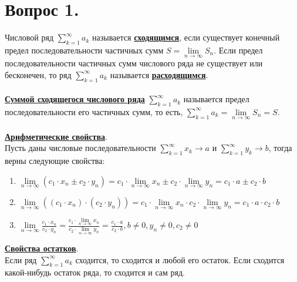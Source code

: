 \documentclass{report}
\begin{document}
\section{Вопрос 1.}

Числовой ряд $\sum\limits_{k=1}^\infty a_k$ называется \textbf{\uline{сходящимся}}, если существует конечный предел последовательности частичных сумм $S = \lim\limits_{n \to \infty} S_n$. Если предел последовательности частичных сумм числового ряда не существует или бесконечен, то ряд $\sum\limits_{k=1}^\infty a_k$ называется \textbf{\uline{расходящимся}}.\\\\

\textbf{\uline{Суммой сходящегося числового ряда}} $\sum\limits_{k=1}^\infty a_k$ называется предел последовательности его частичных сумм, то есть, $\sum\limits_{k=1}^\infty a_k = \lim\limits_{n \to \infty} S_n = S$.\\\\

\textbf{\uline{Арифметические свойства}}.\\
Пусть даны числовые последовательности $\sum\limits_{k=1}^\infty x_k \to a$ и $\sum\limits_{k=1}^\infty y_k \to b$, тогда верны следующие свойства:
\begin{enumerate}
    \item $\lim\limits_{n \to \infty} (c_1 \cdot x_n \pm c_2 \cdot y_n) = c_1 \cdot \lim\limits_{n \to \infty} x_n \pm c_2 \cdot \lim\limits_{n \to \infty} y_n = c_1 \cdot a \pm c_2 \cdot b$
    
    \item $\lim\limits_{n \to \infty} ((c_1 \cdot x_n) \cdot (c_2 \cdot y_n)) = c_1 \cdot \lim\limits_{n \to \infty} x_n \cdot c_2 \cdot \lim\limits_{n \to \infty} y_n = c_1 \cdot a \cdot c_2 \cdot b$
    
    \item $\lim\limits_{n \to \infty} \frac{c_1 \cdot x_n}{c_2 \cdot y_n} = \frac{c_1 \cdot \lim\limits_{n \to \infty} x_n}{c_2 \cdot \lim\limits_{n \to \infty} y_n} = \frac{c_1 \cdot a}{c_2 \cdot b}, b \ne 0, y_n \ne 0, c_2 \ne 0$
\end{enumerate}

\textbf{\uline{Свойства остатков}}.\\
Если ряд $\sum\limits_{k=1}^\infty a_k$ сходится, то сходится и любой его остаток. Если сходится какой-нибудь остаток ряда, то сходится и сам ряд.\\\\
\end{document}
